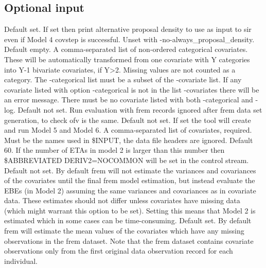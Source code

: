 \subsection{Optional input}
\begin{optionlist}
Default set. If set then print alternative proposal density to use as input to sir even if Model 4 covstep is successful.
Unset with -no-always\_proposal\_density.
\nextopt
{}
Default empty. A comma-separated list of non-ordered categorical covariates. These will be automatically transformed from
one covariate with Y categories into Y-1 bivariate covariates, if Y>2. Missing values are not counted as a category.
The -categorical list must be a subset of the -covariate list. If any covariate listed with option -categorical is not
in the list -covariates there will be an error message. There must be no covariate listed with both -categorical and -log.
\nextopt
{}
Default not set. Run evaluation with frem records ignored after frem data set generation, to check ofv is the same.
\nextopt
{}
Default not set. If set the tool will create and run Model 5 and Model 6.
\nextopt
{}
A comma-separated list of covariates, required. Must be the names used in \$INPUT, the data file headers are ignored.
\nextopt
{}
Default 60. If the number of ETAs in model 2 is larger than this number then\\
\$ABBREVIATED DERIV2=NOCOMMON will be set in the control stream.
\nextopt
{}
Default not set. By default frem will not estimate the variances and covariances of the covariates until the final frem model estimation,
but instead evaluate the EBEs (in Model 2) assuming the same variances and covariances as in covariate data.
These estimates should not differ unless covariates have missing data (which might warrant this option to be set).
Setting this means that Model 2 is estimated which in some cases can be time-consuming.
\nextopt
{}
Default set. By default frem will estimate the mean values of the covariates which have any
missing observations in the frem dataset. Note that the frem dataset contains covariate
observations only from the first original data observation record for each individual.

\end{optionlist}
